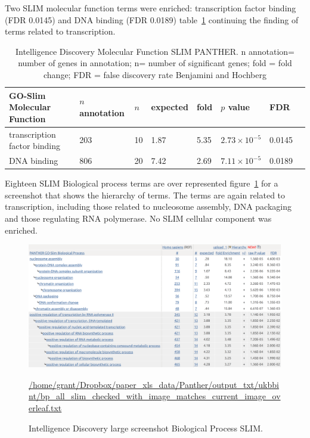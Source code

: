 Two SLIM molecular function terms were enriched: transcription factor binding (FDR 0.0145) and DNA binding (FDR 0.0189)
table~\ref{tab:ukbbint mf slim panther} continuing the finding of terms related to transcription.
  	\begin{table}[]
  	    \centering
  	     \setlength{\extrarowheight}{2pt}
  	    \begin{tabular}{llllllll}
  	    \toprule
  	GO-Slim Molecular Function &	$n$ annotation & $n$ &		expected 	&fold  &	 $p$ value& 	FDR\\
  	   \midrule
transcription factor binding &	203 &	10& 	1.87 &	5.35  &$2.73 \times 10^{-5}$  &	0.0145\\
DNA binding &	806 &	20& 	7.42& 	2.69& 		$7.11 \times 10^{-5}$& 	0.0189\\
\bottomrule
  	    \end{tabular}
  	    \caption{Intelligence Discovery Molecular Function SLIM PANTHER. n annotation= number of genes in annotation; n= number of significant genes; fold = fold change; FDR = false discovery rate Benjamini and Hochberg}
  	    \label{tab:ukbbint mf slim panther}
  	\end{table}
  	
Eighteen SLIM Biological process terms are over represented figure~\ref{fig:ukbb_int_BP_GO_SLIM} for a screenshot that shows the hierarchy of terms. The terms are again related to transcription, including those related to nucleosome assembly, DNA packaging and those regulating RNA polymerase. No SLIM cellular component was enriched. 

\begin{figure}
    \centering
    \includegraphics[width=\textwidth]{images/chapter2/large_screenshots/int_discovery_large_bp_slim_panther.png}
    \caption{Intelligence Discovery large screenshot Biological Process SLIM.}
    \tiny\url{/home/grant/Dropbox/paper_xls_data/Panther/output_txt/ukbbint/bp_all_slim_checked_with_image_matches_current_image_overleaf.txt}
    \label{fig:ukbb_int_BP_GO_SLIM}
\end{figure}

